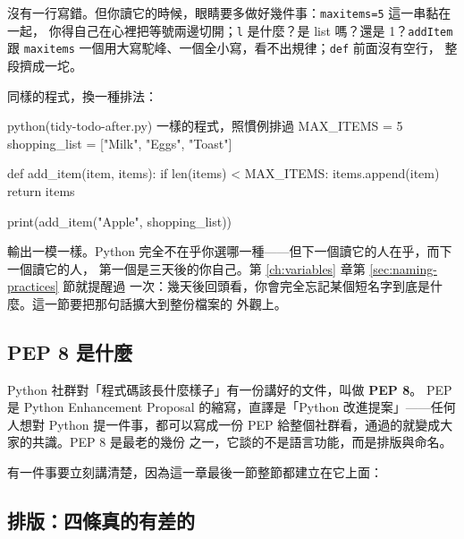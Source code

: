 
沒有一行寫錯。但你讀它的時候，眼睛要多做好幾件事：\texttt{maxitems=5} 這一串黏在一起，
你得自己在心裡把等號兩邊切開；\texttt{l} 是什麼？是 list 嗎？還是 1？\texttt{addItem}
跟 \texttt{maxitems} 一個用大寫駝峰、一個全小寫，看不出規律；\texttt{def} 前面沒有空行，
整段擠成一坨。

同樣的程式，換一種排法：

\begin{example}{python}{(tidy-todo-after.py) 一樣的程式，照慣例排過}
MAX_ITEMS = 5
shopping_list = ["Milk", "Eggs", "Toast"]


def add_item(item, items):
    if len(items) < MAX_ITEMS:
        items.append(item)
    return items


print(add_item("Apple", shopping_list))
\end{example}


輸出一模一樣。Python 完全不在乎你選哪一種——但下一個讀它的人在乎，而下一個讀它的人，
第一個是三天後的你自己。第 \ref{ch:variables} 章第 \ref{sec:naming-practices} 節就提醒過
一次：幾天後回頭看，你會完全忘記某個短名字到底是什麼。這一節要把那句話擴大到整份檔案的
外觀上。

\subsection*{PEP 8 是什麼}

Python 社群對「程式碼該長什麼樣子」有一份講好的文件，叫做 \textbf{PEP 8}。
PEP 是 Python Enhancement Proposal 的縮寫，直譯是「Python 改進提案」——任何人想對 Python
提一件事，都可以寫成一份 PEP 給整個社群看，通過的就變成大家的共識。PEP 8 是最老的幾份
之一，它談的不是語言功能，而是排版與命名。

有一件事要立刻講清楚，因為這一章最後一節整節都建立在它上面：


\subsection*{排版：四條真的有差的}

